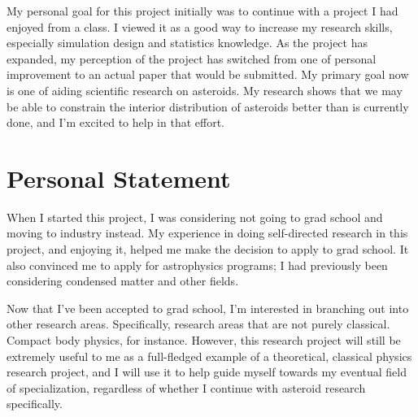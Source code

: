 \documentclass[11pt]{article}
\begin{document}
My personal goal for this project initially was to continue with a project I had enjoyed from a class. I viewed it as a good way to increase my research skills, especially simulation design and statistics knowledge. As the project has expanded, my perception of the project has switched from one of personal improvement to an actual paper that would be submitted. My primary goal now is one of aiding scientific research on asteroids. My research shows that we may be able to constrain the interior distribution of asteroids better than is currently done, and I'm excited to help in that effort.

\section{Personal Statement}
When I started this project, I was considering not going to grad school and moving to industry instead. My experience in doing self-directed research in this project, and enjoying it, helped me make the decision to apply to grad school. It also convinced me to apply for astrophysics programs; I had previously been considering condensed matter and other fields.

Now that I've been accepted to grad school, I'm interested in branching out into other research areas. Specifically, research areas that are not purely classical. Compact body physics, for instance. However, this research project will still be extremely useful to me as a full-fledged example of a theoretical, classical physics research project, and I will use it to help guide myself towards my eventual field of specialization, regardless of whether I continue with asteroid research specifically.

\printbibliography
\end{document}
